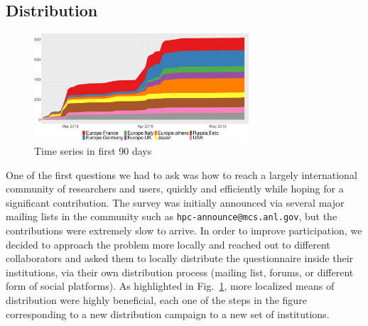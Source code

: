 \documentclass[preprint,5p,times]{elsarticle}
\begin{document}
\subsection*{Distribution}

\begin{figure}[tb]
  \begin{center}
    \includegraphics[width=8.0cm]{R-scripts/TimeSeries.pdf}
    \caption{Time series in first 90 days}
    \label{fig:time-series}
\vspace{-3mm}%
  \end{center}%
\end{figure}

One of the first questions we had to ask was how to reach a largely
international community of researchers and users, quickly and
efficiently while hoping for a significant contribution.
%
The survey was initially announced via several major mailing lists in the
community such as {\tt hpc-announce@mcs.anl.gov}, but the contributions were
extremely slow to arrive. In order to improve participation, we decided to
approach the problem more locally and reached out to different collaborators and
asked them to locally distribute the questionnaire inside their institutions,
via their own distribution process (mailing list, forums, or different form of
social platforms). As highlighted in Fig.~\ref{fig:time-series}, more localized
means of distribution were highly beneficial, each one of the steps in the
figure corresponding to a new distribution campaign to a new set of
institutions.

\end{document}
